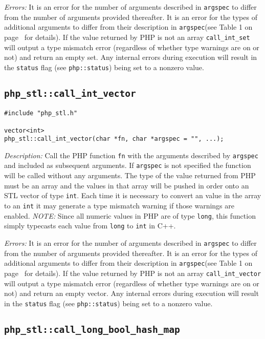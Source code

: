 \documentclass[11pt,titlepage]{article}
\begin{document}
\emph{Errors:} It is an error for the number of arguments described in \verb|argspec| to differ from the number of arguments provided thereafter. It is an error for the types of additional arguments to differ from their description in \verb|argspec|(see Table 1 on page~\pageref{Table1} for details). If the value returned by PHP is not an array \verb|call_int_set| will output a type mismatch error (regardless of whether type warnings are on or not) and return an empty set. Any internal errors during execution will result in the \verb|status| flag (see \verb|php::status|) being set to a nonzero value.


\subsection{\texttt{php\_stl::call\_int\_vector}}
\begin{verbatim}
#include "php_stl.h"

vector<int> 
php_stl::call_int_vector(char *fn, char *argspec = "", ...);
\end{verbatim}

\emph{Description:} Call the PHP function \verb|fn| with the arguments described by \verb|argspec| and included as subsequent arguments. If \verb|argspec| is not specified the function will be called without any arguments. The type of the value returned from PHP must be an array and the values in that array will be pushed in order onto an STL vector of type \verb|int|. Each time it is necessary to convert an value in the array to an \verb|int| it may generate a type mismatch warning if those warnings are enabled. \emph{NOTE:} Since all numeric values in PHP are of type \verb|long|, this function simply typecasts each value from \verb|long| to \verb|int| in C++.

\emph{Errors:} It is an error for the number of arguments described in \verb|argspec| to differ from the number of arguments provided thereafter. It is an error for the types of additional arguments to differ from their description in \verb|argspec|(see Table 1 on page~\pageref{Table1} for details). If the value returned by PHP is not an array \verb|call_int_vector| will output a type mismatch error (regardless of whether type warnings are on or not) and return an empty vector. Any internal errors during execution will result in the \verb|status| flag (see \verb|php::status|) being set to a nonzero value.


\subsection{\texttt{php\_stl::call\_long\_bool\_hash\_map}}
\end{document}
